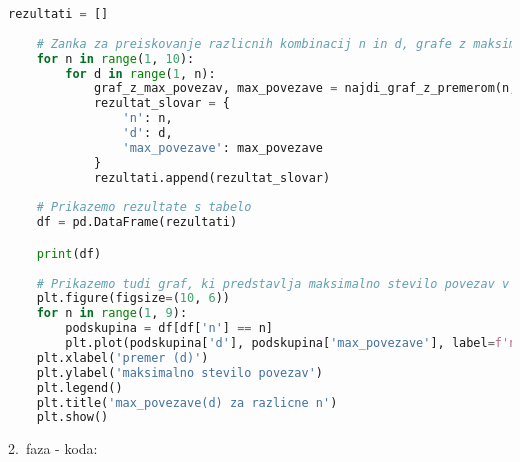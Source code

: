\documentclass[12pt,a4paper]{amsart}
\makeatletter
\renewcommand\subsection{\@startsection{subsection}{2}%
  \z@{.5\linespacing\@plus.7\linespacing}{.5\linespacing}%
  {\normalfont\scshape}}
\theoremstyle{definition} %
\theoremstyle{plain} %
\makeatother
\begin{document}
\begin{lstlisting}[language=Python]
    rezultati = []
    
    # Zanka za preiskovanje razlicnih kombinacij n in d, grafe z maksimalnim stevilom povezav shranjujemo v slovar
    for n in range(1, 10):
        for d in range(1, n):
            graf_z_max_povezav, max_povezave = najdi_graf_z_premerom(n, d)
            rezultat_slovar = {
                'n': n,
                'd': d,
                'max_povezave': max_povezave
            }
            rezultati.append(rezultat_slovar)
    
    # Prikazemo rezultate s tabelo
    df = pd.DataFrame(rezultati)

    print(df)
    
    # Prikazemo tudi graf, ki predstavlja maksimalno stevilo povezav v odvisnosti od d za razlicne n
    plt.figure(figsize=(10, 6))
    for n in range(1, 9):
        podskupina = df[df['n'] == n]
        plt.plot(podskupina['d'], podskupina['max_povezave'], label=f'n={n}')
    plt.xlabel('premer (d)')
    plt.ylabel('maksimalno stevilo povezav')
    plt.legend()
    plt.title('max_povezave(d) za razlicne n')
    plt.show()
\end{lstlisting}

\subsection{2.\ faza - koda:}
\vspace{10pt}
    
\end{document}
